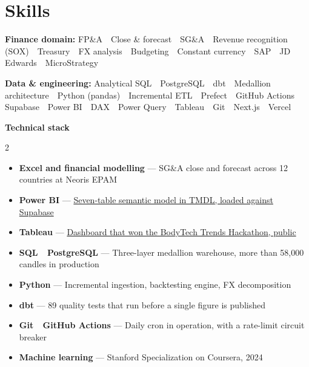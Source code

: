 \documentclass[a4paper,10pt]{article}
\begin{document}
\section*{Skills}
\textbf{\color{ink}Finance domain:} FP\&A \,\textperiodcentered\, Close \& forecast \,\textperiodcentered\, SG\&A \,\textperiodcentered\, Revenue recognition (SOX) \,\textperiodcentered\, Treasury \,\textperiodcentered\, FX analysis \,\textperiodcentered\, Budgeting \,\textperiodcentered\, Constant currency \,\textperiodcentered\, SAP \,\textperiodcentered\, JD Edwards \,\textperiodcentered\, MicroStrategy\par\vspace{3pt}
\textbf{\color{ink}Data \& engineering:} Analytical SQL \,\textperiodcentered\, PostgreSQL \,\textperiodcentered\, dbt \,\textperiodcentered\, Medallion architecture \,\textperiodcentered\, Python (pandas) \,\textperiodcentered\, Incremental ETL \,\textperiodcentered\, Prefect \,\textperiodcentered\, GitHub Actions \,\textperiodcentered\, Supabase \,\textperiodcentered\, Power BI \,\textperiodcentered\, DAX \,\textperiodcentered\, Power Query \,\textperiodcentered\, Tableau \,\textperiodcentered\, Git \,\textperiodcentered\, Next.js \,\textperiodcentered\, Vercel\par\vspace{3pt}
\textbf{\color{ink}Technical stack}\par\vspace{2pt}
\begin{multicols}{2}
\begin{itemize}[leftmargin=1.1em, itemsep=1pt, topsep=0pt, parsep=0pt]
  \item \textbf{\color{ink}Excel and financial modelling} --- SG\&A close and forecast across 12 countries at Neoris EPAM
  \item \textbf{\color{ink}Power BI} --- \href{https://proyecto-davirson-git.vercel.app/en/projects/powerbi}{Seven-table semantic model in TMDL, loaded against Supabase}
  \item \textbf{\color{ink}Tableau} --- \href{https://public.tableau.com/app/profile/davirson.novoa/viz/BodyTrendsADataAnalysisProject/TrendsAnalysis}{Dashboard that won the BodyTech Trends Hackathon, public}
  \item \textbf{\color{ink}SQL \,\textperiodcentered\, PostgreSQL} --- Three-layer medallion warehouse, more than 58,000 candles in production
  \item \textbf{\color{ink}Python} --- Incremental ingestion, backtesting engine, FX decomposition
  \item \textbf{\color{ink}dbt} --- 89 quality tests that run before a single figure is published
  \item \textbf{\color{ink}Git \,\textperiodcentered\, GitHub Actions} --- Daily cron in operation, with a rate-limit circuit breaker
  \item \textbf{\color{ink}Machine learning} --- Stanford Specialization on Coursera, 2024
\end{itemize}
\end{multicols}
\end{document}
